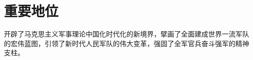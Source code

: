 \documentclass[lang=cn,newtx,12pt,scheme=chinese]{elegantbook}
\begin{document}
\section{重要地位}
开辟了马克思主义军事理论中国化时代化的新境界，擘画了全面建成世界一流军队的宏伟蓝图，引领了新时代人民军队的伟大变革，强固了全军官兵奋斗强军的精神支柱。
\end{document}

